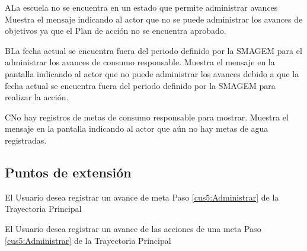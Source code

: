 \begin{UCtrayectoriaA}{A}{La escuela no se encuentra en un estado que permite administrar avances}
    \UCpaso[\UCactor] Muestra el mensaje  indicando al actor que no se puede administrar los avances de objetivos ya que el Plan de acción no se encuentra aprobado.
 \end{UCtrayectoriaA}

   \begin{UCtrayectoriaA}{B}{La fecha actual se encuentra fuera del periodo definido por la SMAGEM para el administrar los avances de consumo responsable.}
    \UCpaso[\UCsist] Muestra el mensaje  en la pantalla  indicando al actor que no puede administrar los avances debido a que la fecha actual se encuentra fuera del periodo definido por la SMAGEM para realizar la acción. 
 \end{UCtrayectoriaA}
 
  \begin{UCtrayectoriaA}{C}{No hay registros de metas de consumo responsable para mostrar.}
    \UCpaso[\UCsist] Muestra el mensaje  en la pantalla  indicando al actor que aún no hay metas de agua registradas. 
 \end{UCtrayectoriaA}

\subsection{Puntos de extensión}

\UCExtensionPoint
{El Usuario desea registrar un avance de meta}
{Paso \ref{cus5:Administrar} de la Trayectoria Principal}
{}

\UCExtensionPoint
{El Usuario desea registrar un avance de las acciones de una meta}
{Paso \ref{cus5:Administrar} de la Trayectoria Principal}
{}